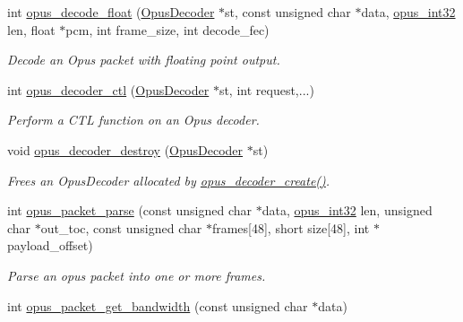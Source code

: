 \begin{DoxyCompactItemize}
int \hyperlink{group__opus__decoder_ga9c554b8c0214e24733a299fe53bb3bd2}{opus\_\-decode\_\-float} (\hyperlink{group__opus__decoder_ga401d8579958d36094715a6b90cd159a6}{OpusDecoder} $\ast$st, const unsigned char $\ast$data, \hyperlink{opus__types_8h_aa4d309d6f80b99dbabebc8f98879ab9a}{opus\_\-int32} len, float $\ast$pcm, int frame\_\-size, int decode\_\-fec)
\begin{DoxyCompactList}\small\item\em Decode an Opus packet with floating point output. \item\end{DoxyCompactList}\item 
int \hyperlink{group__opus__decoder_ga2d492844b4f66e7f34d85870f13d4846}{opus\_\-decoder\_\-ctl} (\hyperlink{group__opus__decoder_ga401d8579958d36094715a6b90cd159a6}{OpusDecoder} $\ast$st, int request,...)
\begin{DoxyCompactList}\small\item\em Perform a CTL function on an Opus decoder. \item\end{DoxyCompactList}\item 
void \hyperlink{group__opus__decoder_gafebf4cb3c29c9317cac385446a76e36e}{opus\_\-decoder\_\-destroy} (\hyperlink{group__opus__decoder_ga401d8579958d36094715a6b90cd159a6}{OpusDecoder} $\ast$st)
\begin{DoxyCompactList}\small\item\em Frees an {\ttfamily OpusDecoder} allocated by \hyperlink{group__opus__decoder_ga753f6fe0b699c81cfd47d70c8e15a0bd}{opus\_\-decoder\_\-create()}. \item\end{DoxyCompactList}\item 
int \hyperlink{group__opus__decoder_ga3426076e549ac8d02e9a4d0e681d498e}{opus\_\-packet\_\-parse} (const unsigned char $\ast$data, \hyperlink{opus__types_8h_aa4d309d6f80b99dbabebc8f98879ab9a}{opus\_\-int32} len, unsigned char $\ast$out\_\-toc, const unsigned char $\ast$frames\mbox{[}48\mbox{]}, short size\mbox{[}48\mbox{]}, int $\ast$payload\_\-offset)
\begin{DoxyCompactList}\small\item\em Parse an opus packet into one or more frames. \item\end{DoxyCompactList}\item 
int \hyperlink{group__opus__decoder_ga89b9375b6ff5e15f07fdc5d0cf4f0053}{opus\_\-packet\_\-get\_\-bandwidth} (const unsigned char $\ast$data)

\end{DoxyCompactItemize}
